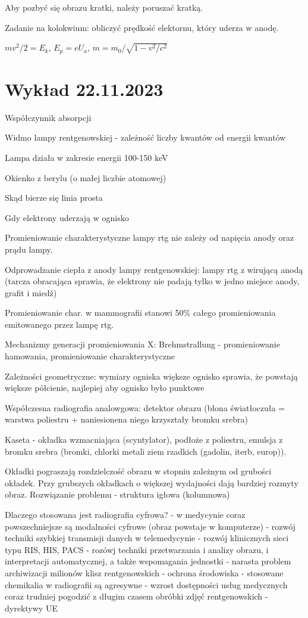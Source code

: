 \documentclass{article}
\begin{document}
Aby pozbyć się obrazu kratki, należy poruszać kratką.

Zadanie na kolokwium: obliczyć prędkość elektornu, który uderza w anodę.

$mv^2/2 = E_k$, $E_p = eU_a$, $m = m_0 / \sqrt{1-v^2/c^2}$

\section{Wykład 22.11.2023}

Współczynnik absorpcji

Widmo lampy rentgenowskiej - zależność liczby kwantów od energii kwantów

Lampa działa w zakresie energii 100-150 keV

Okienko z berylu (o małej liczbie atomowej)

Skąd bierze się linia prosta 

Gdy elektrony uderzają w ognisko

Promieniowanie charakterystyczne lampy rtg nie zależy od napięcia anody oraz prądu lampy.

Odprowadzanie ciepła z anody lampy rentgenowskiej: lampy rtg z wirującą anodą (tarcza obracająca sprawia, że elektrony nie padają tylko w jedno miejsce anody, grafit i miedź)

Promieniowanie char. w mammografii stanowi 50\% całego promieniowania emitowanego przez lampę rtg.

Mechanizmy generacji promieniowania X: Brehmstrallung - promieniowanie hamowania, promieniowanie charakterystyczne

Zależności geometryczne: wymiary ogniska
większe ognisko sprawia, że powstają większe półcienie, najlepiej aby ognisko było punktowe

Współczesna radiografia analowgowa: detektor obrazu (błona światłoczuła = warstwa poliestru + naniesionena niego krzyształy bromku srebra)

Kaseta - okładka wzmacniająca (scyntylator), podłoże z poliestru, emulsja z bromku srebra (bromki, chlorki metali ziem rzadkich (gadolin, iterb, europ)). 

Okładki pograszają rozdzielczość obrazu w stopniu zależnym od grubości okładek. Przy grubszych okładkach o większej wydajności dają bardziej rozmyty obraz. Rozwiązanie problemu - struktura igłowa (kolumnowa)

Dlaczego stosowana jest radiografia cyfrowa?
- w medycynie coraz powszechniejsze są modalności cyfrowe (obraz powstaje w komputerze)
- rozwój techniki szybkiej transmisji danych w telemedycynie
- rozwój klinicznych sieci typu RIS, HIS, PACS
- rozówj techniki przetwarzania i analizy obrazu, i interpretacji automatycznej, a także wspomagania jednostki
- narasta problem archiwizacji milionów klisz rentgenowskich
- ochrona środowiska - stosowane chemikalia w radiografii są agresywne
- wzrost dostępności usług medycznych coraz trudniej pogodzić z długim czasem obróbki zdjęć rentgenowskich
- dyrektywy UE
\end{document}
